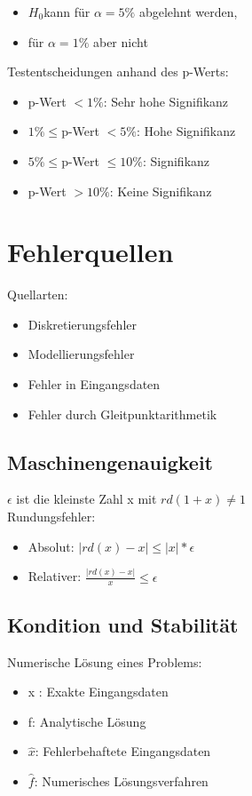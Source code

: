 \documentclass[10pt,landscape,a4paper]{article}
\begin{document}
\begin{multicols}{3}
\begin{itemize}
	\setlength\itemsep{-0.2em}
	\item $H_0 $kann für $\alpha = 5\%$ abgelehnt werden,
	\item für $\alpha = 1\%$ aber nicht
\end{itemize}

Testentscheidungen anhand des p-Werts:
\begin{itemize}
	\setlength\itemsep{-0.2em}
	\item p-Wert $<1\%$: Sehr hohe Signifikanz
	\item $1\% \leq$p-Wert $<5\%$: Hohe Signifikanz
	\item $5\% \leq$p-Wert $\leq10\%$: Signifikanz
	\item p-Wert $>10\%$: Keine Signifikanz
\end{itemize}

\section{Fehlerquellen}
Quellarten:

\begin{itemize}
	\setlength\itemsep{-0.2em}
	\item Diskretierungsfehler
	\item Modellierungsfehler
	\item Fehler in Eingangsdaten
	\item Fehler durch Gleitpunktarithmetik
\end{itemize}

\subsection{Maschinengenauigkeit}
$\epsilon$ ist die kleinste Zahl x mit $rd(1+x) \neq 1$ \\

Rundungsfehler:
\begin{itemize}
	\setlength\itemsep{-0.2em}
	\item Absolut: $|rd(x)-x| \leq |x| * \epsilon$
	\item Relativer: $\frac{|rd(x)-x|}{x} \leq \epsilon$
\end{itemize}

\subsection{Kondition und Stabilität}
Numerische Lösung eines Problems:
\begin{itemize}
	\setlength\itemsep{-0.2em}
	\item x : Exakte Eingangsdaten
	\item f: Analytische Lösung
	\item $\hat{x}$: Fehlerbehaftete Eingangsdaten
	\item $\hat{f}$: Numerisches Lösungsverfahren
\end{itemize}


\end{multicols}
\end{document}
